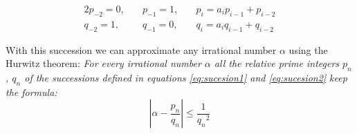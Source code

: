 \documentclass[prl,amsmath,amssymb, twocolumn, showpacs]{revtex4-1}
\begin{document}
\begin{alignat}{2}
p_{-2} = 0,  &\quad p_{-1} = 1,  &\quad p_i=a_i p_{i-1}+p_{i-2}
\label{eq:sucesion1}
\\ 
q_{-2} = 1,  &\quad q_{-1} = 0,  &\quad q_i=a_i q_{i-1}+q_{i-2} 
\label{eq:sucesion2}
\end{alignat}

With this succession we can approximate any irrational number $\alpha$ using the Hurwitz theorem:
\emph{For every irrational number $\alpha$ all the relative prime integers $p_n$, $q_n$ of the successions defined in equations \ref{eq:sucesion1} and \ref{eq:sucesion2} keep the formula:}
\begin{equation}
|\alpha- \frac{p_n}{q_n}|\leq  \frac{1}{{q_n}^2} 
\end{equation}




\end{document}
